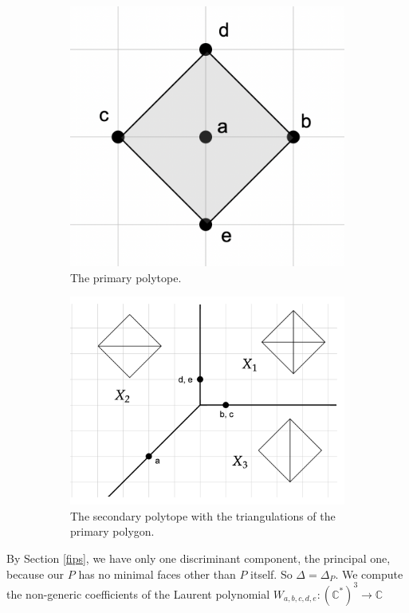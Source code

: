 \documentclass[oneside]{amsart}
\theoremstyle{definition}
\theoremstyle{definition}
\theoremstyle{definition}
\theoremstyle{definition}
\newcommand{\CC}{\mathbb{C}}
\begin{document}
\begin{figure}[!h]
\centering
\begin{subfigure}{.5\textwidth}
  \centering
  \includegraphics[width=.8\linewidth]{rank2exmp/primarypolygon1.png}
  \caption{The primary polytope.}
  \label{fig:primary}
\end{subfigure}%
\begin{subfigure}{.5\textwidth}
  \centering
  \includegraphics[width=.8\linewidth]{rank2exmp/toricfans1.png}
  \caption{The secondary polytope with the triangulations of the primary polygon. }
  \label{fig:sub2}
\end{subfigure}
\caption{}
\label{fig:test}
\end{figure}
By Section \ref{fips}, we have only one discriminant component, the principal one, because our $P$ has no minimal faces other than $P$ itself. So $\Delta = \Delta_P$. We compute the non-generic coefficients of the Laurent polynomial $W_{a,b,c,d,e} : (\CC^*)^3 \to \CC$
\end{document}

